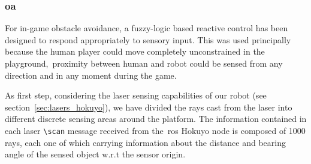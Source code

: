 \subsubsection{\glsdesc{oa}}\label{sec:obt_avoidance}
For in-game obstacle avoidance, a fuzzy-logic based reactive control has been designed to respond appropriately to sensory input. This was used principally because the human player could move completely unconstrained in the playground,~\ie proximity between human and robot could be sensed from any direction and in any moment during the game. 

As first step, considering the laser sensing capabilities of our robot (see section~\ref{sec:lasers_hokuyo}), we have divided the rays cast from the laser into different discrete sensing areas around the platform. The information  contained in each laser \verb|\scan| message received from the~\gls{ros} Hokuyo node is composed of 1000 rays, each one of which carrying information about the distance and bearing angle of the sensed object w.r.t the sensor origin. %


